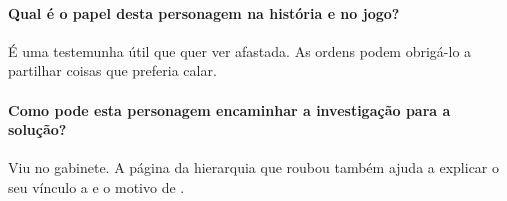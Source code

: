 {{\paragraph{Qual é o papel desta personagem na história e no jogo?}
É uma testemunha útil que quer ver  afastada. As ordens podem obrigá-lo a partilhar coisas que preferia calar.

\paragraph{Como pode esta personagem encaminhar a investigação para a solução?}
Viu  no gabinete. A página da hierarquia que roubou também ajuda a explicar o seu vínculo a  e o motivo de .
}
}

